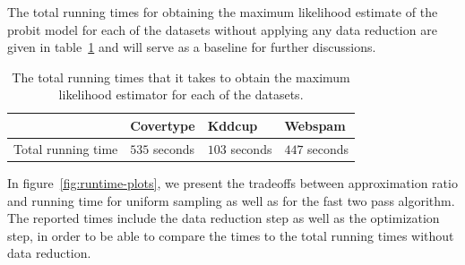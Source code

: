 The total running times for obtaining the maximum
likelihood estimate of the probit model for each of the
datasets without applying any data reduction are given in
table~\ref{tab:running-times} and will serve as a
baseline for further discussions.

\begin{table}[ht!]
    \centering
    \begin{tabular}{ l | l| l| l}
        \hline
                           & \textbf{Covertype} & \textbf{Kddcup} & \textbf{Webspam} \\ \hline
        Total running time & $535$ seconds      & $103$ seconds   & $447$ seconds    \\ \hline
    \end{tabular}
    \caption{The total running times that it takes to obtain the maximum
        likelihood estimator for each of the datasets.}
    \label{tab:running-times}
\end{table}

In figure~\ref{fig:runtime-plots}, we present the
tradeoffs between approximation ratio and running time
for uniform sampling as well as for the fast two pass algorithm.
The reported times include the data reduction step as
well as the optimization step, in order to be able to
compare the times to the total running times without data reduction.

